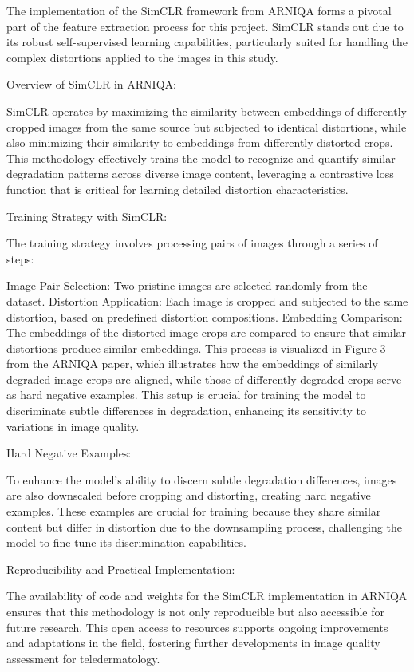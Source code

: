 The implementation of the SimCLR framework from ARNIQA forms a pivotal part of the feature extraction process for this project. SimCLR stands out due to its robust self-supervised learning capabilities, particularly suited for handling the complex distortions applied to the images in this study.

Overview of SimCLR in ARNIQA:

SimCLR operates by maximizing the similarity between embeddings of differently cropped images from the same source but subjected to identical distortions, while also minimizing their similarity to embeddings from differently distorted crops. This methodology effectively trains the model to recognize and quantify similar degradation patterns across diverse image content, leveraging a contrastive loss function that is critical for learning detailed distortion characteristics.

Training Strategy with SimCLR:

The training strategy involves processing pairs of images through a series of steps:

Image Pair Selection: Two pristine images are selected randomly from the dataset.
Distortion Application: Each image is cropped and subjected to the same distortion, based on predefined distortion compositions.
Embedding Comparison: The embeddings of the distorted image crops are compared to ensure that similar distortions produce similar embeddings.
This process is visualized in Figure 3 from the ARNIQA paper, which illustrates how the embeddings of similarly degraded image crops are aligned, while those of differently degraded crops serve as hard negative examples. This setup is crucial for training the model to discriminate subtle differences in degradation, enhancing its sensitivity to variations in image quality.

Hard Negative Examples:

To enhance the model’s ability to discern subtle degradation differences, images are also downscaled before cropping and distorting, creating hard negative examples. These examples are crucial for training because they share similar content but differ in distortion due to the downsampling process, challenging the model to fine-tune its discrimination capabilities.

Reproducibility and Practical Implementation:

The availability of code and weights for the SimCLR implementation in ARNIQA ensures that this methodology is not only reproducible but also accessible for future research. This open access to resources supports ongoing improvements and adaptations in the field, fostering further developments in image quality assessment for teledermatology.

